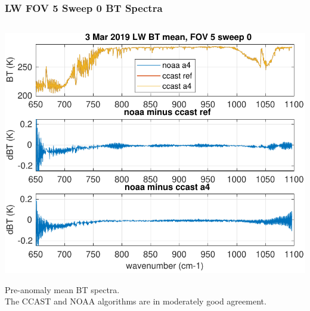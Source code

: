 \documentclass[10pt]{beamer}
\begin{document}
\begin{frame}
\begin{columns}[t]
\begin{column}{0.5\textwidth}
\end{column}
\end{columns}
\end{frame}
\begin{frame}
\frametitle{LW FOV 5 Sweep 0 BT Spectra}
\begin{columns}[t]
\begin{column}{0.5\textwidth}
  \begin{centering}
  \includegraphics[width=\textwidth]{figures/LW_MW_good_BT_fov5_sd0.pdf}
  \end{centering}\vspace{3mm}
  Pre-anomaly mean BT spectra.  \\The CCAST and NOAA algorithms
  are in moderately good agreement.


\end{column}
\end{columns}
\end{frame}
\end{document}
